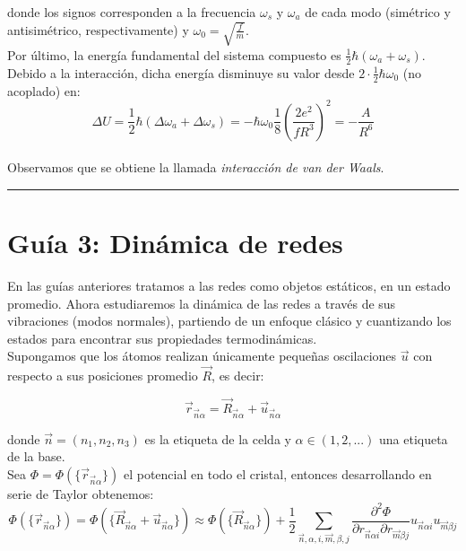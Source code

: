 \documentclass[a4paper]{article}
\begin{document}
donde los signos corresponden a la frecuencia $\omega_{s}$ y $\omega_{a}$ de cada modo (sim\'etrico y antisim\'etrico, respectivamente) y $\omega_{0} = \sqrt{\frac{f}{m}}$.\\

Por \'ultimo, la energ\'ia fundamental del sistema compuesto es $\frac{1}{2}\hbar(\omega_{a} + \omega_{s})$. Debido a la interacci\'on, dicha energ\'ia disminuye su valor desde $2 \cdot \frac{1}{2}\hbar\omega_{0}$ (no acoplado) en:\\

$$ \Delta U = \frac{1}{2}\hbar(\Delta \omega_{a} + \Delta\omega_{s}) = -\hbar \omega_{0}\frac{1}{8}\left( \frac{2e^{2}}{fR^{3}} \right)^{2} = -\frac{A}{R^{6}}$$\\

Observamos que se obtiene la llamada \textit{interacci\'on de van der Waals}.

\begin{center}
\noindent\rule{15cm}{0.4pt}
\end{center}

\section{Gu\'ia 3: Din\'amica de redes}

En las gu\'ias anteriores tratamos a las redes como objetos est\'aticos, en un estado promedio. Ahora estudiaremos la din\'amica de las redes a trav\'es de sus vibraciones (modos normales), partiendo de un enfoque cl\'asico y cuantizando los estados para encontrar sus propiedades termodin\'amicas.\\

Supongamos que los \'atomos realizan \'unicamente peque\~nas oscilaciones $\vec{u}$ con respecto a sus posiciones promedio $\vec{R}$, es decir:

$$ \vec{r}_{\vec{n}\alpha} = \vec{R}_{\vec{n}\alpha} + \vec{u}_{\vec{n}\alpha}$$

donde $\vec{n} = (n_{1}, n_{2}, n_{3})$ es la etiqueta de la celda y $\alpha \in (1, 2, ...)$ una etiqueta de la base.\\

Sea $\Phi = \Phi(\{ \vec{r}_{\vec{n}\alpha}\})$ el potencial en todo el cristal, entonces desarrollando en serie de Taylor obtenemos:\\

$$\Phi(\{ \vec{r}_{\vec{n}\alpha}\}) = \Phi(\{ \vec{R}_{\vec{n}\alpha} + \vec{u}_{\vec{n}\alpha}\}) \approx \Phi(\{ \vec{R}_{\vec{n}\alpha}\}) + \frac{1}{2}\sum_{\vec{n},\alpha, i, \vec{m}, \beta, j} \frac{\partial^{2}\Phi}{\partial r_{\vec{n}\alpha i}\partial r_{\vec{m} \beta j}}u_{\vec{n}\alpha i}u_{\vec{m} \beta j}$$
\end{document}
